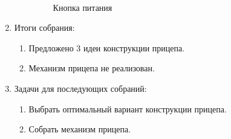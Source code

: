 \begin{enumerate}
\begin{enumerate}
		\begin{figure}[H]
			\begin{minipage}[h]{0.2\linewidth}
				\center  
			\end{minipage}
			\begin{minipage}[h]{0.6\linewidth}
				\caption{Кнопка питания}
			\end{minipage}
		\end{figure}
		
	\end{enumerate}
	
	\item Итоги собрания: \newline
	\begin{enumerate}
		\item Предложено 3 идеи конструкции прицепа.\newline
		
		\item Механизм прицепа не реализован.\newline
		
	\end{enumerate}
	
	\item Задачи для последующих собраний:\newline
	\begin{enumerate}
		\item Выбрать оптимальный вариант конструкции прицепа.\newline
		
		\item Собрать механизм прицепа.\newline
		
	\end{enumerate}     
\end{enumerate}

\fillpage

